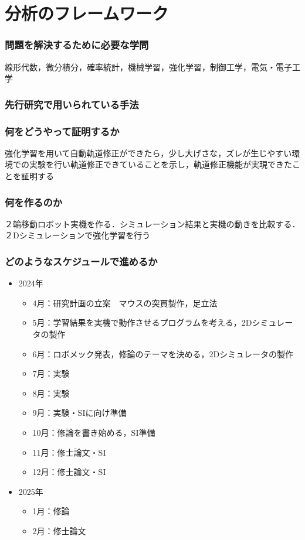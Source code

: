 \documentclass[a4paper,11pt]{jsarticle}
\begin{document}
\section{分析のフレームワーク}
\subsubsection{問題を解決するために必要な学問}
線形代数，微分積分，確率統計，機械学習，強化学習，制御工学，電気・電子工学
\subsubsection{先行研究で用いられている手法}

\subsubsection{何をどうやって証明するか}
強化学習を用いて自動軌道修正ができたら，少し大げさな，ズレが生じやすい環境での実験を行い軌道修正できていることを示し，軌道修正機能が実現できたことを証明する

\subsubsection{何を作るのか}
２輪移動ロボット実機を作る．シミュレーション結果と実機の動きを比較する．
２Dシミュレーションで強化学習を行う

\subsubsection{どのようなスケジュールで進めるか}
\begin{itemize}
  \item 2024年
  \begin{itemize}
    \item 4月：研究計画の立案　マウスの突貫製作，足立法 
    \item 5月：学習結果を実機で動作させるプログラムを考える，2Dシミュレータの製作
    \item 6月：ロボメック発表，修論のテーマを決める，2Dシミュレータの製作
    \item 7月：実験
    \item 8月：実験
    \item 9月：実験・SIに向け準備
    \item 10月：修論を書き始める，SI準備
    \item 11月：修士論文・SI
    \item 12月：修士論文・SI
  \end{itemize}
  \item 2025年
  \begin{itemize}
    \item 1月：修論
    \item 2月：修士論文
  \end{itemize}
\end{itemize}
\end{document}
